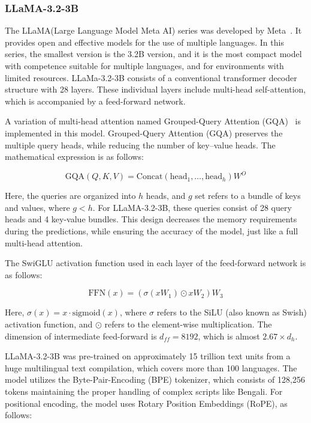 \documentclass[10pt,letterpaper]{article}
\begin{document}
\subsubsection*{LLaMA-3.2-3B}

The LLaMA(Large Language Model Meta AI) series was developed by Meta~\cite{b36}. It provides open and effective models for the use of multiple languages. In this series, the smallest version is the 3.2B version, and it is the most compact model with competence suitable for multiple languages, and for environments with limited resources. LLaMa-3.2-3B consists of a conventional transformer decoder structure with 28 layers. These individual layers include multi-head self-attention, which is accompanied by a feed-forward network.

A variation of multi-head attention named Grouped-Query Attention (GQA)~\cite{b42} is implemented in this model. Grouped-Query Attention (GQA) preserves the multiple query heads, while reducing the number of key–value heads. The mathematical expression is as follows:    

\begin{equation}
\text{GQA}(Q,K,V)=\text{Concat}(\text{head}_1,\dots,\text{head}_h)W^O
\label{eq:gqa}
\end{equation}

Here, the queries are organized into \(h\) heads, and \(g\) set refers to a bundle of keys and values, where \(g<h\). For LLaMA-3.2-3B, these queries consist of 28 query heads and 4 key-value bundles. This design decreases the memory requirements during the predictions, while ensuring the accuracy of the model, just like a full multi-head attention. 

The SwiGLU activation function used in each layer of the feed-forward network is as follows: 

\begin{equation}
\text{FFN}(x) = (\sigma(xW_1) \odot xW_2)W_3
\label{eq:swiglu}
\end{equation}

Here, \(\sigma(x) = x \cdot \text{sigmoid}(x)\), where \(\sigma\) refers to the SiLU (also known as Swish) activation function, and \(\odot\) refers to the element-wise multiplication. The dimension of intermediate feed-forward is \(d_{ff} = 8192\), which is almost \(2.67 \times d_h\).

LLaMA-3.2-3B was pre-trained on approximately 15 trillion text units from a huge multilingual text compilation, which covers more than 100 languages. The model utilizes the Byte-Pair-Encoding (BPE) tokenizer, which consists of 128,256 tokens maintaining the proper handling of complex scripts like Bengali. For positional encoding, the model uses Rotary Position Embeddings (RoPE), as follows:
\end{document}
